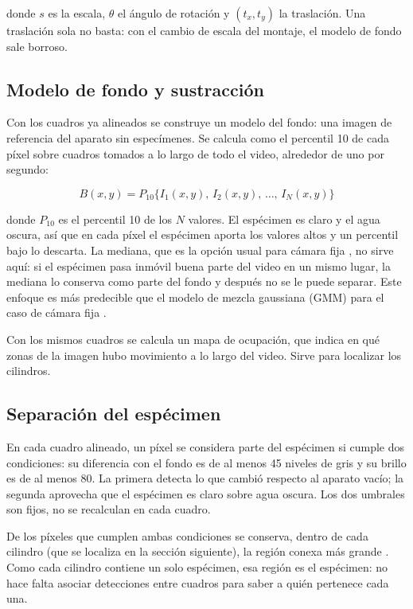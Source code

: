 donde $s$ es la escala, $\theta$ el ángulo de rotación y $(t_x, t_y)$ la traslación. Una
traslación sola no basta: con el cambio de escala del montaje, el modelo de fondo sale
borroso.

\subsection{Modelo de fondo y sustracción}

Con los cuadros ya alineados se construye un modelo del fondo: una imagen de referencia
del aparato sin especímenes. Se calcula como el percentil 10 de cada píxel sobre cuadros
tomados a lo largo de todo el video, alrededor de uno por segundo:

\begin{equation}
    B(x,y) = P_{10}\bigl\{ I_1(x,y),\, I_2(x,y),\, \ldots,\, I_N(x,y) \bigr\}
    \label{eq:fondo}
\end{equation}

donde $P_{10}$ es el percentil 10 de los $N$ valores. El espécimen es claro y el agua
oscura, así que en cada píxel el espécimen aporta los valores altos y un percentil bajo
lo descarta. La mediana, que es la opción usual para cámara fija \cite{piccardi2004},
no sirve aquí: si el espécimen pasa inmóvil buena parte del video en un mismo lugar, la
mediana lo conserva como parte del fondo y después no se le puede separar. Este enfoque
es más predecible que el modelo de mezcla gaussiana (GMM) \cite{zivkovic2004} para el
caso de cámara fija \cite{piccardi2004}.

Con los mismos cuadros se calcula un mapa de ocupación, que indica en qué zonas de la
imagen hubo movimiento a lo largo del video. Sirve para localizar los cilindros.

\subsection{Separación del espécimen}

En cada cuadro alineado, un píxel se considera parte del espécimen si cumple dos
condiciones: su diferencia con el fondo es de al menos 45 niveles de gris y su brillo es
de al menos 80. La primera detecta lo que cambió respecto al aparato vacío; la segunda
aprovecha que el espécimen es claro sobre agua oscura. Los dos umbrales son fijos, no se
recalculan en cada cuadro.

De los píxeles que cumplen ambas condiciones se conserva, dentro de cada cilindro (que se
localiza en la sección siguiente), la región conexa más grande \cite{bradski2008}. Como cada cilindro contiene un solo
espécimen, esa región es el espécimen: no hace falta asociar detecciones entre cuadros
para saber a quién pertenece cada una.

